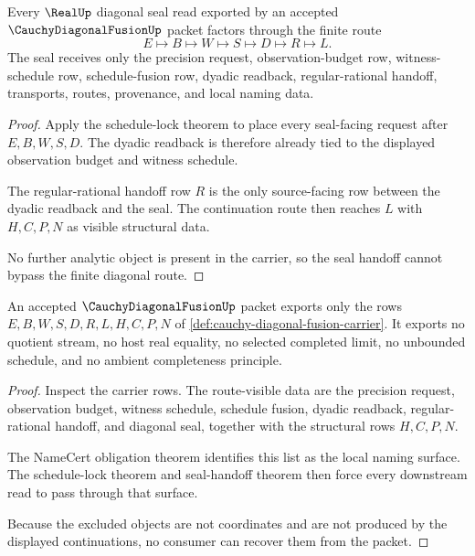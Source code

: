 \begin{theorem}
\label{thm:cauchy-diagonal-fusion-real-seal-handoff}
Every $\RealUp$ diagonal seal read exported by an accepted $\CauchyDiagonalFusionUp$ packet factors through the finite route
$$
E \longmapsto B \longmapsto W \longmapsto S \longmapsto D \longmapsto R \longmapsto L.
$$
The seal receives only the precision request, observation-budget row, witness-schedule row, schedule-fusion row, dyadic readback, regular-rational handoff, transports, routes, provenance, and local naming data.
\end{theorem}
\begin{proof}
Apply the schedule-lock theorem to place every seal-facing request after $E,B,W,S,D$. The dyadic readback is therefore already tied to the displayed observation budget and witness schedule.

The regular-rational handoff row $R$ is the only source-facing row between the dyadic readback and the seal. The continuation route then reaches $L$ with $H,C,P,N$ as visible structural data.

No further analytic object is present in the carrier, so the seal handoff cannot bypass the finite diagonal route.
\end{proof}

\begin{theorem}
\label{thm:cauchy-diagonal-fusion-nonescape}
An accepted $\CauchyDiagonalFusionUp$ packet exports only the rows $E,B,W,S,D,R,L,H,C,P,N$ of \autoref{def:cauchy-diagonal-fusion-carrier}. It exports no quotient stream, no host real equality, no selected completed limit, no unbounded schedule, and no ambient completeness principle.
\end{theorem}
\begin{proof}
Inspect the carrier rows. The route-visible data are the precision request, observation budget, witness schedule, schedule fusion, dyadic readback, regular-rational handoff, and diagonal seal, together with the structural rows $H,C,P,N$.

The NameCert obligation theorem identifies this list as the local naming surface. The schedule-lock theorem and seal-handoff theorem then force every downstream read to pass through that surface.

Because the excluded objects are not coordinates and are not produced by the displayed continuations, no consumer can recover them from the packet.
\end{proof}

